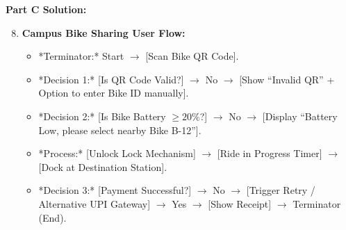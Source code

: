 \begin{solutionbox}
\textbf{Part C Solution:}
\begin{enumerate}[leftmargin=1.2em, itemsep=3pt]
    \setcounter{enumi}{7}
    \item \textbf{Campus Bike Sharing User Flow:}
    \begin{itemize}
        \item *Terminator:* Start $\rightarrow$ [Scan Bike QR Code].
        \item *Decision 1:* [Is QR Code Valid?] $\rightarrow$ No $\rightarrow$ [Show ``Invalid QR'' + Option to enter Bike ID manually].
        \item *Decision 2:* [Is Bike Battery $\ge 20\%$?] $\rightarrow$ No $\rightarrow$ [Display ``Battery Low, please select nearby Bike B-12''].
        \item *Process:* [Unlock Lock Mechanism] $\rightarrow$ [Ride in Progress Timer] $\rightarrow$ [Dock at Destination Station].
        \item *Decision 3:* [Payment Successful?] $\rightarrow$ No $\rightarrow$ [Trigger Retry / Alternative UPI Gateway] $\rightarrow$ Yes $\rightarrow$ [Show Receipt] $\rightarrow$ Terminator (End).
    \end{itemize}
\end{enumerate}
\end{solutionbox}
